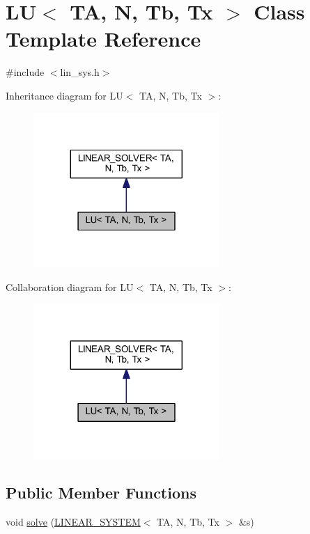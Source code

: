 \hypertarget{class_l_u}{}\section{LU$<$ TA, N, Tb, Tx $>$ Class Template Reference}
\label{class_l_u}


{\ttfamily \#include $<$lin\+\_\+sys.\+h$>$}



Inheritance diagram for LU$<$ TA, N, Tb, Tx $>$\+:
\nopagebreak
\begin{figure}[H]
\begin{center}
\leavevmode
\includegraphics[width=200pt]{class_l_u__inherit__graph}
\end{center}
\end{figure}


Collaboration diagram for LU$<$ TA, N, Tb, Tx $>$\+:
\nopagebreak
\begin{figure}[H]
\begin{center}
\leavevmode
\includegraphics[width=200pt]{class_l_u__coll__graph}
\end{center}
\end{figure}
\subsection*{Public Member Functions}
\begin{DoxyCompactItemize}
\item 
void \mbox{\hyperlink{class_l_u_a624d7ff38645debae206313534516f49}{solve}} (\mbox{\hyperlink{class_l_i_n_e_a_r___s_y_s_t_e_m}{L\+I\+N\+E\+A\+R\+\_\+\+S\+Y\+S\+T\+EM}}$<$ TA, N, Tb, Tx $>$ \&s)
\end{DoxyCompactItemize}


